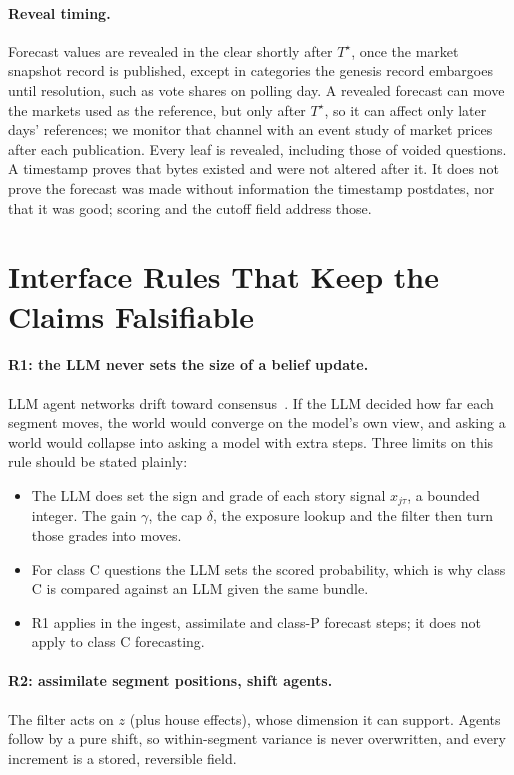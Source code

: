 \documentclass[11pt]{article}
\begin{document}
\paragraph{Reveal timing.} Forecast values are revealed in the clear shortly after $T^\star$, once the market snapshot record is published, except in categories the genesis record embargoes until resolution, such as vote shares on polling day. A revealed forecast can move the markets used as the reference, but only after $T^\star$, so it can affect only later days' references; we monitor that channel with an event study of market prices after each publication. Every leaf is revealed, including those of voided questions. A timestamp proves that bytes existed and were not altered after it. It does not prove the forecast was made without information the timestamp postdates, nor that it was good; scoring and the cutoff field address those.

\section{Interface Rules That Keep the Claims Falsifiable}\label{sec:interfaces}

\paragraph{R1: the LLM never sets the size of a belief update.} LLM agent networks drift toward consensus~\citep{chuang2023opinion}. If the LLM decided how far each segment moves, the world would converge on the model's own view, and asking a world would collapse into asking a model with extra steps. Three limits on this rule should be stated plainly:
\begin{itemize}
  \item The LLM does set the sign and grade of each story signal $x_{j\tau}$, a bounded integer. The gain $\gamma$, the cap $\delta$, the exposure lookup and the filter then turn those grades into moves.
  \item For class C questions the LLM sets the scored probability, which is why class C is compared against an LLM given the same bundle.
  \item R1 applies in the \textsf{ingest}, \textsf{assimilate} and class-P \textsf{forecast} steps; it does not apply to class C forecasting.
\end{itemize}

\paragraph{R2: assimilate segment positions, shift agents.} The filter acts on $z$ (plus house effects), whose dimension it can support. Agents follow by a pure shift, so within-segment variance is never overwritten, and every increment is a stored, reversible field.
\end{document}
